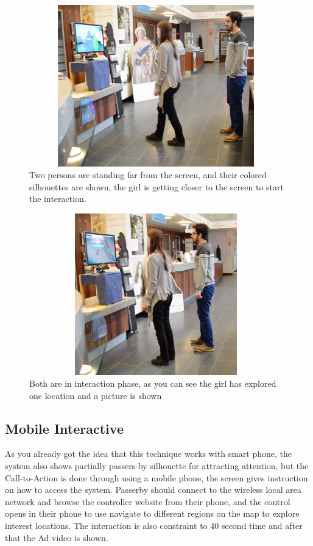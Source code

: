 \begin{figure}[H]
    \centering
    \includegraphics[width=110mm,height=70mm]{Figures/8/body_motivation}%
    \caption{Two persons are standing far from the screen, and their colored silhouettes are shown, the girl is getting closer to the screen to start the interaction.}%
    \label{fig:bodymotivationsystem}%
\end{figure}

\begin{figure}[H]
    \centering
    \includegraphics[width=110mm,height=70mm]{Figures/8/body_interaction}%
    \caption{Both are in interaction phase, as you can see the girl has explored one location and a picture is shown}%
    \label{fig:bodyinteractionsystem}%
\end{figure}

\subsection{Mobile Interactive}
As you already got the idea that this technique works with smart phone, the system also shows partially passers-by silhouette for attracting attention, but the Call-to-Action is done through using a mobile phone, the screen gives instruction on how to access the system. Passerby should connect to the wireless local area network and browse the controller website from their phone, and the control opens in their phone to use navigate to different regions on the map to explore interest locations. The interaction is also constraint to 40 second time and after that the Ad video is shown.


